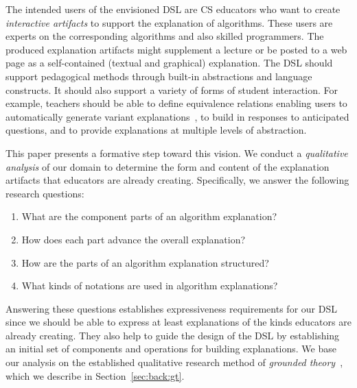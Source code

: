 \documentclass[sigconf]{acmart}
\begin{document}
The intended users of the envisioned DSL are CS educators who want to create
\emph{interactive artifacts} to support the explanation of algorithms. These
users are experts on the corresponding algorithms and also skilled
programmers. The produced explanation artifacts might supplement a lecture or
be posted to a web page as a self-contained (textual and graphical)
explanation.
%
The DSL should support pedagogical methods through built-in
abstractions and language constructs. It should also support a variety of forms
of student interaction. For example, teachers should be able to define
equivalence relations enabling users to automatically generate variant
explanations~\cite{EW13jvlc}, to build in responses to anticipated
questions, and to provide explanations at multiple levels of abstraction.


This paper presents a formative step toward this vision. We conduct a
\emph{qualitative analysis} of our domain to determine the form and content of
the explanation artifacts that educators are already creating.
%
Specifically, we answer the following research questions:
%
\begin{enumerate}[label=RQ\arabic*.,ref=RQ\arabic*,leftmargin=*]

\item \label{rq:what}
%
What are the component parts of an algorithm explanation?

\item \label{rq:how}
%
How does each part advance the overall explanation?

\item \label{rq:structure}
%
How are the parts of an algorithm explanation structured?

\item \label{rq:notations}
%
What kinds of notations are used in algorithm explanations?

\end{enumerate}
%
Answering these questions establishes expressiveness requirements for our DSL
since we should be able to express at least explanations of the kinds educators
are already creating. They also help to guide the design of the DSL by
establishing an initial set of components and operations for building
explanations.
%
We base our analysis on the established qualitative research method of
\emph{grounded theory}~\cite{Strauss67discoveryof}, which we describe in
Section~\ref{sec:back:gt}.
\end{document}
